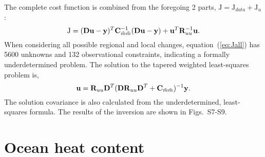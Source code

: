 \documentclass[12pt]{article}
\begin{document}
The complete cost function is combined from the foregoing 2 parts,
$\mbox{J} = \mbox{J}_{data} + \mbox{J}_u$:
\begin{equation} \label{eq:Jall}
\mbox{J} = ({\bf Du} - {\bf y})^T {\bf C}^{-1}_{{\tilde m}{\tilde m}} ({\bf Du} - {\bf y})
+ {\bf u}^T {\bf R}_{uu}^{-1} {\bf u}.
\end{equation}
When considering all possible regional and local changes,
equation~(\ref{eq:Jall}) has 5600 unknowns and 132 observational
constraints, indicating a formally underdetermined problem. 
The solution to the tapered weighted least-squares problem is,
\begin{equation}
{\bf u} = {\bf R}_{uu} {\bf D}^T ({\bf D} {\bf R}_{uu} {\bf D}^T + {\bf C}_{{\tilde m}{\tilde m}})^{-1}
{\bf y}.
\end{equation}
The solution covariance is also calculated from the underdetermined, least-squares formula. The results of the inversion are shown in Figs.~S7-S9.

\section{Ocean heat content}
\end{document}
